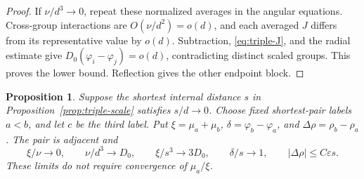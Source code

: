 \documentclass[11pt,a4paper]{article}
\numberwithin{equation}{section}
\newtheorem{proposition}[theorem]{Proposition}
\theoremstyle{remark}
\newcommand{\eps}{\varepsilon}
\begin{document}
\begin{proof}
If $\nu/d^3\to0$, repeat these normalized averages in the angular equations. Cross-group interactions are $O(\nu/d^2)=o(d)$, and each averaged $J$ differs from its representative value by $o(d)$. Subtraction, \eqref{eq:triple-J}, and the radial estimate give $D_0(\varphi_i-\varphi_j)=o(d)$, contradicting distinct scaled groups. This proves the lower bound. Reflection gives the other endpoint block.
\end{proof}

\begin{proposition}\label{prop:nested-scale}
Suppose the shortest internal distance $s$ in Proposition~\ref{prop:triple-scale} satisfies $s/d\to0$. Choose fixed shortest-pair labels $a<b$, and let $c$ be the third label. Put $\xi=\mu_a+\mu_b$, $\delta=\varphi_b-\varphi_a$, and $\Delta\rho=\rho_b-\rho_a$. The pair is adjacent and
\begin{equation}\label{eq:nested-scale}
 \xi/\nu\to0,\qquad \nu/d^3\to D_0,\qquad \xi/s^3\to3D_0,
 \qquad \delta/s\to1,\qquad |\Delta\rho|\le C\eps s.
\end{equation}
These limits do not require convergence of $\mu_a/\xi$.
\end{proposition}
\end{document}
